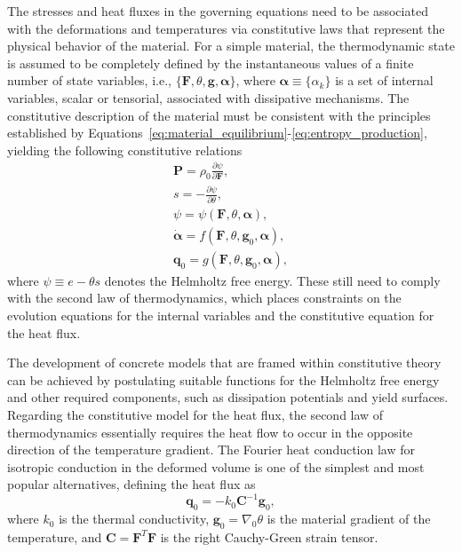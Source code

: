 The stresses and heat fluxes in the governing equations need to be associated with the deformations and temperatures via constitutive laws that represent the physical behavior of the material.
For a simple material, the thermodynamic state is assumed to be completely defined by the instantaneous values of a finite number of state variables, i.e., \(\{\bm{F}, \theta, \bm{g}, \bm{\alpha}\}\), where \(\bm{\alpha} \equiv \{\alpha_k\}\) is a set of internal variables, scalar or tensorial, associated with dissipative mechanisms.
The constitutive description of the material must be consistent with the principles established by Equations~\eqref{eq:material_equilibrium}-\eqref{eq:entropy_production}, yielding the following constitutive relations
\begin{gather}
  \bm{P} = \rho_0 \frac{\partial \psi}{\partial \bm{F}},\\
  s = - \frac{\partial \psi}{\partial \theta},\\
  \psi = \psi(\bm{F},\theta, \bm{\alpha}),\label{eq:thermo_mech_helmholtz_free_energy}\\
  \dot{\bm{\alpha}} = f(\bm{F}, \theta, \bm{g}_0,\bm{\alpha}),\\
  \bm{q}_0 = g(\bm{F}, \theta, \bm{g}_0, \bm{\alpha}),
\end{gather}
where \(\psi \equiv e - \theta s\) denotes the Helmholtz free energy.
These still need to comply with the second law of thermodynamics, which places constraints on the evolution equations for the internal variables and the constitutive equation for the heat flux.

The development of concrete models that are framed within constitutive theory can be achieved by postulating suitable functions for the  Helmholtz free energy and other required components, such as dissipation potentials and yield surfaces.
Regarding the constitutive model for the heat flux, the second law of thermodynamics essentially requires the heat flow to occur in the opposite direction of the temperature gradient.
The Fourier heat conduction law for isotropic conduction in the deformed volume is one of the simplest and most popular alternatives, defining the heat flux as
\begin{equation}
  \bm{q}_0 = - k_0 \bm{C}^{-1} \bm{g}_0,
\end{equation}
where \(k_0\) is the thermal conductivity, \(\bm{g}_0 = \nabla_0 \theta\) is the material gradient of the temperature, and \(\bm{C} = \bm{F}^T \bm{F}\) is the right Cauchy-Green strain tensor.


